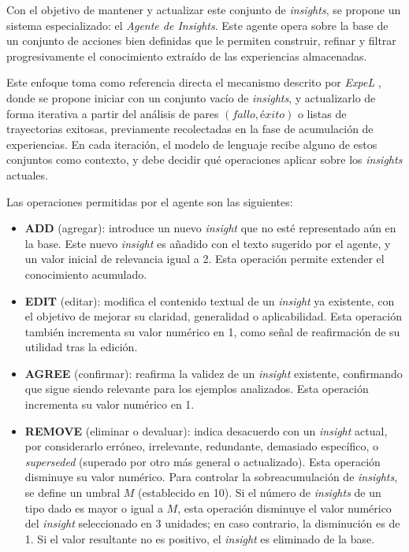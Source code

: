 Con el objetivo de mantener y actualizar este conjunto de \textit{insights}, se propone un sistema especializado: el \textit{Agente de Insights}. Este agente opera sobre la base de un conjunto de acciones bien definidas que le permiten construir, refinar y filtrar progresivamente el conocimiento extraído de las experiencias almacenadas.

Este enfoque toma como referencia directa el mecanismo descrito por \textit{ExpeL} \parencite{zhao2024expel}, donde se propone iniciar con un conjunto vacío de \textit{insights}, y actualizarlo de forma iterativa a partir del análisis de pares $(\textit{fallo}, \textit{éxito})$ o listas de trayectorias exitosas, previamente recolectadas en la fase de acumulación de experiencias. En cada iteración, el modelo de lenguaje recibe alguno de estos conjuntos como contexto, y debe decidir qué operaciones aplicar sobre los \textit{insights} actuales.

Las operaciones permitidas por el agente son las siguientes:

\begin{itemize}
  \item \textbf{ADD} (agregar): introduce un nuevo \textit{insight} que no esté representado aún en la base. Este nuevo \textit{insight} es añadido con el texto sugerido por el agente, y un valor inicial de relevancia igual a 2. Esta operación permite extender el conocimiento acumulado.

  \item \textbf{EDIT} (editar): modifica el contenido textual de un \textit{insight} ya existente, con el objetivo de mejorar su claridad, generalidad o aplicabilidad. Esta operación también incrementa su valor numérico en 1, como señal de reafirmación de su utilidad tras la edición.

  \item \textbf{AGREE} (confirmar): reafirma la validez de un \textit{insight} existente, confirmando que sigue siendo relevante para los ejemplos analizados. Esta operación incrementa su valor numérico en 1.

  \item \textbf{REMOVE} (eliminar o devaluar): indica desacuerdo con un \textit{insight} actual, por considerarlo erróneo, irrelevante, redundante, demasiado específico, o \textit{superseded} (superado por otro más general o actualizado). Esta operación disminuye su valor numérico. Para controlar la sobreacumulación de \textit{insights}, se define un umbral $M$ (establecido en 10). Si el número de \textit{insights} de un tipo dado es mayor o igual a $M$, esta operación disminuye el valor numérico del \textit{insight} seleccionado en 3 unidades; en caso contrario, la disminución es de 1. Si el valor resultante no es positivo, el \textit{insight} es eliminado de la base.
\end{itemize}

